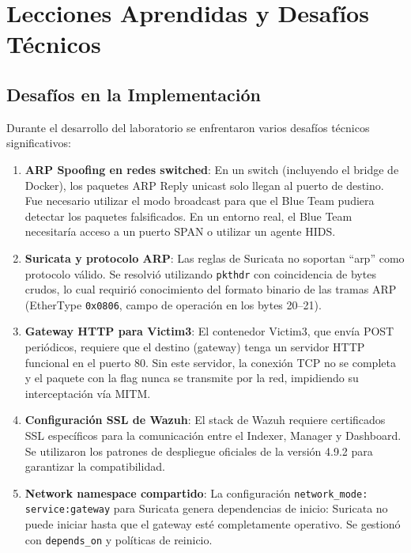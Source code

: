 \documentclass[12pt, a4paper]{article}
\begin{document}
\newpage

\section{Lecciones Aprendidas y Desaf\'ios T\'ecnicos}

\subsection{Desaf\'ios en la Implementaci\'on}

Durante el desarrollo del laboratorio se enfrentaron varios desaf\'ios t\'ecnicos significativos:

\begin{enumerate}[leftmargin=2cm]
    \item \textbf{ARP Spoofing en redes switched}: En un switch (incluyendo el bridge de Docker), los paquetes ARP Reply unicast solo llegan al puerto de destino. Fue necesario utilizar el modo broadcast para que el Blue Team pudiera detectar los paquetes falsificados. En un entorno real, el Blue Team necesitar\'ia acceso a un puerto SPAN o utilizar un agente HIDS.

    \item \textbf{Suricata y protocolo ARP}: Las reglas de Suricata no soportan ``arp'' como protocolo v\'alido. Se resolvi\'o utilizando \texttt{pkthdr} con coincidencia de bytes crudos, lo cual requiri\'o conocimiento del formato binario de las tramas ARP (EtherType \texttt{0x0806}, campo de operaci\'on en los bytes 20--21).

    \item \textbf{Gateway HTTP para Victim3}: El contenedor Victim3, que env\'ia POST peri\'odicos, requiere que el destino (gateway) tenga un servidor HTTP funcional en el puerto 80. Sin este servidor, la conexi\'on TCP no se completa y el paquete con la flag nunca se transmite por la red, impidiendo su interceptaci\'on v\'ia MITM.

    \item \textbf{Configuraci\'on SSL de Wazuh}: El stack de Wazuh requiere certificados SSL espec\'ificos para la comunicaci\'on entre el Indexer, Manager y Dashboard. Se utilizaron los patrones de despliegue oficiales de la versi\'on 4.9.2 para garantizar la compatibilidad.

    \item \textbf{Network namespace compartido}: La configuraci\'on \texttt{network\_mode: service:gateway} para Suricata genera dependencias de inicio: Suricata no puede iniciar hasta que el gateway est\'e completamente operativo. Se gestion\'o con \texttt{depends\_on} y pol\'iticas de reinicio.
\end{enumerate}
\end{document}
